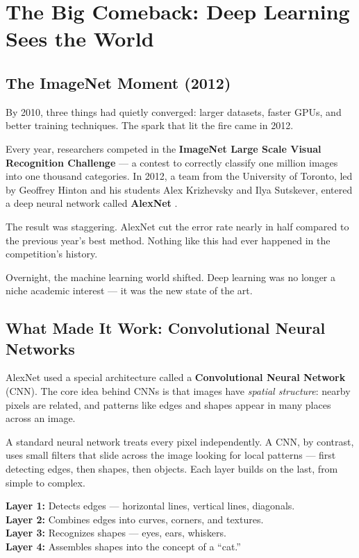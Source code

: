 \section{The Big Comeback: Deep Learning Sees the World}

\subsection{The ImageNet Moment (2012)}

By 2010, three things had quietly converged: larger datasets, faster GPUs, and better training techniques.
The spark that lit the fire came in 2012.

Every year, researchers competed in the \textbf{ImageNet Large Scale Visual Recognition Challenge} \cite{russakovsky2015imagenet} --- a contest to correctly classify one million images into one thousand categories.
In 2012, a team from the University of Toronto, led by Geoffrey Hinton and his students Alex Krizhevsky and Ilya Sutskever, entered a deep neural network called \textbf{AlexNet} \cite{krizhevsky2012imagenet}.

The result was staggering.
AlexNet cut the error rate nearly in half compared to the previous year's best method.
Nothing like this had ever happened in the competition's history.

Overnight, the machine learning world shifted.
Deep learning was no longer a niche academic interest --- it was the new state of the art.

\subsection{What Made It Work: Convolutional Neural Networks}

AlexNet used a special architecture called a \textbf{Convolutional Neural Network} (CNN).
The core idea behind CNNs is that images have \emph{spatial structure}: nearby pixels are related, and patterns like edges and shapes appear in many places across an image.

A standard neural network treats every pixel independently.
A CNN, by contrast, uses small filters that slide across the image looking for local patterns --- first detecting edges, then shapes, then objects.
Each layer builds on the last, from simple to complex.

\begin{tcolorbox}[colback=blue!5!white, colframe=blue!40!black, title=How a CNN Sees a Cat]
\textbf{Layer 1:} Detects edges --- horizontal lines, vertical lines, diagonals. \\
\textbf{Layer 2:} Combines edges into curves, corners, and textures. \\
\textbf{Layer 3:} Recognizes shapes --- eyes, ears, whiskers. \\
\textbf{Layer 4:} Assembles shapes into the concept of a ``cat.''
\end{tcolorbox}

